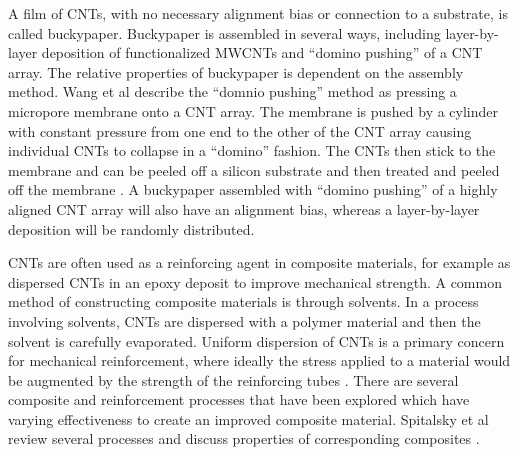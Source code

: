 	A film of CNTs, with no necessary alignment bias or connection to a substrate, is called buckypaper. Buckypaper is assembled in several ways, including layer-by-layer deposition of functionalized MWCNTs \cite{Lee2008} and ``domino pushing'' of a CNT array. The relative properties of buckypaper is dependent on the assembly method. Wang et al describe the ``domnio pushing'' method as pressing a micropore membrane onto a CNT array. The membrane is pushed by a cylinder with constant pressure from one end to the other of the CNT array causing individual CNTs to collapse in a ``domino'' fashion. The CNTs then stick to the membrane and can be peeled off a silicon substrate and then treated and peeled off the membrane \cite{Wang2008}. A buckypaper assembled with ``domino pushing'' of a highly aligned CNT array will also have an alignment bias, whereas a layer-by-layer deposition will be randomly distributed.

	CNTs are often used as a reinforcing agent in composite materials, for example as dispersed CNTs in an epoxy deposit to improve mechanical strength. A common method of constructing composite materials is through solvents. In a process involving solvents, CNTs are dispersed with a polymer material and then the solvent is carefully evaporated. Uniform dispersion of CNTs is a primary concern for mechanical reinforcement, where ideally the stress applied to a material would be augmented by the strength of the reinforcing tubes \cite{Coleman2006}. There are several composite and reinforcement processes that have been explored which have varying effectiveness to create an improved composite material. Spitalsky et al review several processes and discuss properties of corresponding composites \cite{Spitalsky2010}.

